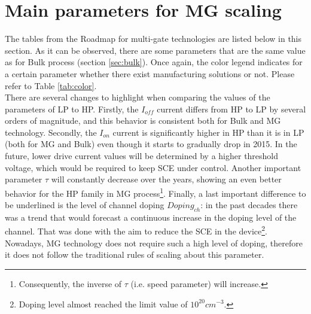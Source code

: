 \documentclass[a4paper, 12pt, twoside, openright]{report}
\begin{document}

\newpage

\section{Main parameters for MG scaling}
The tables from the Roadmap for multi-gate technologies are listed below in this section. As it can be observed, there are some parameters that are the same value as for Bulk process (section \ref{sec:bulk}). Once again, the color legend indicates for a certain parameter whether there exist manufacturing solutions or not. Please refer to Table \ref{tab:color}.\\
There are several changes to highlight when comparing the values of the parameters of LP to HP. Firstly, the $I_{off}$ current differs from HP to LP by several orders of magnitude, and this behavior is consistent both for Bulk and MG technology. Secondly, the $I_{on}$ current is significantly higher in HP than it is in LP (both for MG and Bulk) even though it starts to gradually drop in 2015. In the future, lower drive current values will be determined by a higher threshold voltage, which would be required to keep SCE under control. Another important parameter $\tau$ will constantly decrease over the years, showing an even better behavior for the HP family in MG process\footnote{Consequently, the inverse of $\tau$ (i.e. speed parameter) will increase.}. Finally, a last important difference to be underlined is the level of channel doping $Doping_{ch}$: in the past decades there was a trend that would forecast a continuous increase in the doping level of the channel. That was done with the aim to reduce the SCE in the device\footnote{Doping level almost reached the limit value of $10^{20} cm^{-3}$.}. Nowadays, MG technology does not require such a high level of doping, therefore it does not follow the traditional rules of scaling about this parameter.
\end{document}
